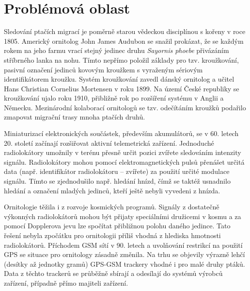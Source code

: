 
\chapter{Problémová oblast}{\tiny }


Sledování ptačích migrací je poměrně starou vědeckou disciplínou s kořeny v roce 1805. Americký ornitolog John James Audubon se snažil prokázat, že se každým rokem na jeho farmu vrací stejný jedinec druhu \emph{Sayornis phoebe} přivázáním stříbrného lanka na nohu. Tímto nepřímo položil základy pro tzv. kroužkování, pasivní označení jedinců kovovým kroužkem s vyraženým sériovým identifikátorem kroužku. Systém kroužkování zavedl dánský ornitolog a učitel Hans Christian Cornelius Mortensen v roku 1899. Na území České republiky se kroužkování ujalo roku 1910, přibližně rok po rozšíření systému v Anglii a Německu. Mezinárodní kolaborací ornitologů se tzv. odečítáním kroužků podařilo zmapovat migrační trasy mnoha ptačích druhů. 


Miniaturizací elektronických součástek, především akumulátorů, se v 60. letech 20. století začínají rozšiřovat aktivní telemetrická zařízení. Jednoduché radiolokátory umožnily v terénu přesně určit pozici zvířete sledováním intenzity signálu. Radiolokátory mohou pomocí elektromagnetických pulsů přenášet určitá data (např. identifikátor radiolokátoru -- zvířete) za použití určité modulace signálu. Tímto se zjednodušilo např. hledání hnízd, čímž se taktéž usnadnilo hledání a označení mladých jedinců, kteří ještě nebyli vyvedeni z hnízda.


Ornitologie těžila i z rozvoje kosmických programů. Signály z dostatečně výkonných radiolokátorů mohou být přijaty speciálními družicemi v kosmu a za pomocí Dopplerova jevu lze spočítat přibližnou polohu daného jedince. Tato řešení nebyla zpočátku pro ornitologii příliš vhodná z hlediska hmotnosti radiolokátorů. Příchodem GSM sítí v 90. letech a uvolňování restrikcí na použití GPS se situace pro ornitology zásadně změnila. Na trhu se objevily výrazně lehčí (desítky až jednotky gramů) GPS-GSM trackery vhodné i pro malé druhy ptáků. Data z těchto trackerů se průběžně sbírají a odesílají do systémů výrobců zařízení, případně přímo majiteli zařízení.

